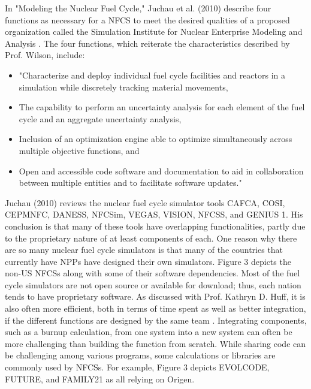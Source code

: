 \documentclass[12pt]{UIdahoMastersThesis}
\begin{document}
In "Modeling the Nuclear Fuel Cycle," Juchau et al. (2010) describe four functions as necessary for a NFCS to meet the desired qualities of a proposed organization called the Simulation Institute for Nuclear Enterprise Modeling and Analysis \cite{Juchau2010}. The four functions, which reiterate the characteristics described by Prof. Wilson, include:

\begin{itemize}
\item "Characterize and deploy individual fuel cycle facilities and reactors in a simulation while discretely tracking material movements,
\item The capability to perform an uncertainty analysis for each element of the fuel cycle and an aggregate uncertainty analysis,
\item Inclusion of an optimization engine able to optimize simultaneously across multiple objective functions, and 
\item Open and accessible code software and documentation to aid in collaboration between multiple entities and to facilitate software updates." 
\end{itemize}

Juchau (2010) reviews the nuclear fuel cycle simulator tools CAFCA, COSI, CEPMNFC, DANESS, NFCSim, VEGAS, VISION, NFCSS, and GENIUS 1. His conclusion is that many of these tools have overlapping functionalities, partly due to the proprietary nature of at least components of each. One reason why there are so many nuclear fuel cycle simulators is that many of the countries that currently have NPPs have designed their own simulators. Figure 3 depicts the non-US NFCSs along with some of their software dependencies. Most of the fuel cycle simulators are not open source or available for download; thus, each nation tends to have proprietary software. As discussed with Prof. Kathryn D. Huff, it is also often more efficient, both in terms of time spent as well as better integration, if the different functions are designed by the same team \cite{redfoot_huff_2016}. Integrating components, such as a burnup calculation, from one system into a new system can often be more challenging than building the function from scratch. While sharing code can be challenging among various programs, some calculations or libraries are commonly used by NFCSs. For example, Figure 3 depicts EVOLCODE, FUTURE, and FAMILY21 as all relying on Origen.
\end{document}
